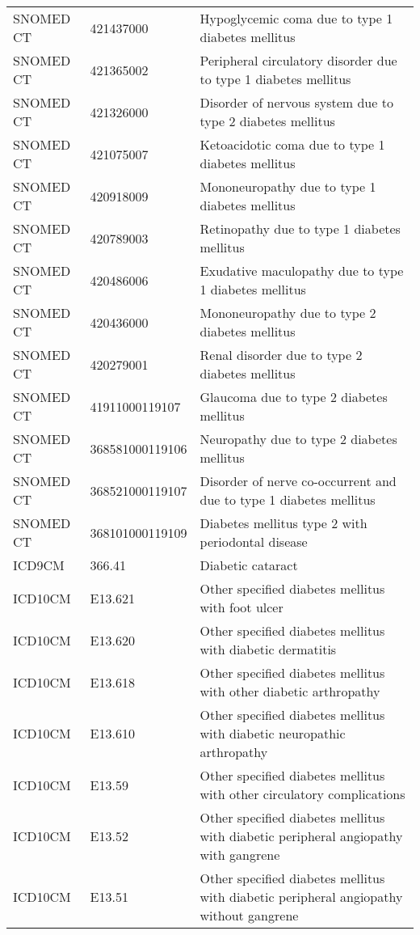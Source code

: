 \begin{table}[ht]
\begin{tabular}{lll}
  SNOMED CT & 421437000 & Hypoglycemic coma due to type 1 diabetes mellitus \\ 
  SNOMED CT & 421365002 & Peripheral circulatory disorder due to type 1 diabetes mellitus \\ 
  SNOMED CT & 421326000 & Disorder of nervous system due to type 2 diabetes mellitus \\ 
  SNOMED CT & 421075007 & Ketoacidotic coma due to type 1 diabetes mellitus \\ 
  SNOMED CT & 420918009 & Mononeuropathy due to type 1 diabetes mellitus \\ 
  SNOMED CT & 420789003 & Retinopathy due to type 1 diabetes mellitus \\ 
  SNOMED CT & 420486006 & Exudative maculopathy due to type 1 diabetes mellitus \\ 
  SNOMED CT & 420436000 & Mononeuropathy due to type 2 diabetes mellitus \\ 
  SNOMED CT & 420279001 & Renal disorder due to type 2 diabetes mellitus \\ 
  SNOMED CT & 41911000119107 & Glaucoma due to type 2 diabetes mellitus \\ 
  SNOMED CT & 368581000119106 & Neuropathy due to type 2 diabetes mellitus \\ 
  SNOMED CT & 368521000119107 & Disorder of nerve co-occurrent and due to type 1 diabetes mellitus \\ 
  SNOMED CT & 368101000119109 & Diabetes mellitus type 2 with periodontal disease \\ 
  ICD9CM & 366.41 & Diabetic cataract \\ 
  ICD10CM & E13.621 & Other specified diabetes mellitus with foot ulcer \\ 
  ICD10CM & E13.620 & Other specified diabetes mellitus with diabetic dermatitis \\ 
  ICD10CM & E13.618 & Other specified diabetes mellitus with other diabetic arthropathy \\ 
  ICD10CM & E13.610 & Other specified diabetes mellitus with diabetic neuropathic arthropathy \\ 
  ICD10CM & E13.59 & Other specified diabetes mellitus with other circulatory complications \\ 
  ICD10CM & E13.52 & Other specified diabetes mellitus with diabetic peripheral angiopathy with gangrene \\ 
  ICD10CM & E13.51 & Other specified diabetes mellitus with diabetic peripheral angiopathy without gangrene \\ 

\end{tabular}
\end{table}

